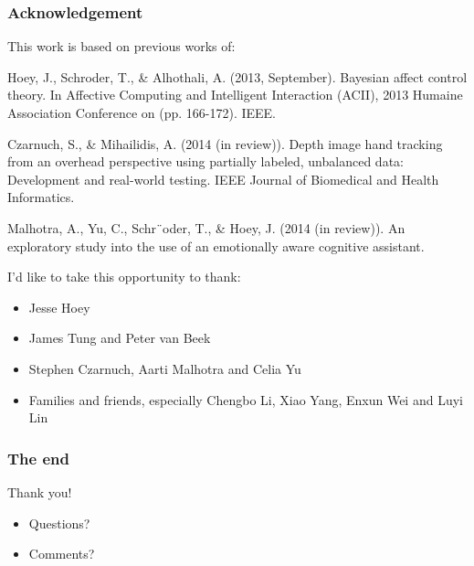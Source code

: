 \documentclass{beamer}
\begin{document}
\begin{frame}
\frametitle{Acknowledgement}
This work is based on previous works of:
\begin{itemize}
\footnotesize{
\item Hoey, J., Schroder, T., \& Alhothali, A. (2013, September). Bayesian affect control theory. In Affective Computing and Intelligent Interaction (ACII), 2013 Humaine Association Conference on (pp. 166-172). IEEE.
\item Czarnuch, S., \& Mihailidis, A. (2014 (in review)). Depth image hand tracking from an overhead perspective using partially labeled, unbalanced data: Development and real-world testing. IEEE Journal of Biomedical and Health Informatics.
\item Malhotra, A., Yu, C., Schr¨oder, T., \& Hoey, J. (2014 (in review)). An exploratory study into the use of an emotionally aware cognitive assistant.
}
\end{itemize}
\vspace{0.3cm}
I'd like to take this opportunity to thank:
\begin{itemize}
\item Jesse Hoey
\item James Tung and Peter van Beek
\item Stephen Czarnuch, Aarti Malhotra and Celia Yu
\item Families and friends, especially Chengbo Li, Xiao Yang, Enxun Wei and Luyi Lin
\end{itemize}
\end{frame}
\begin{frame}
\frametitle{The end}
\Huge{\centerline{Thank you!}}   
\fontsize{5mm}{4mm}
\begin{itemize}
\item Questions?
\item Comments?
\end{itemize}
\end{frame}

\end{document}
